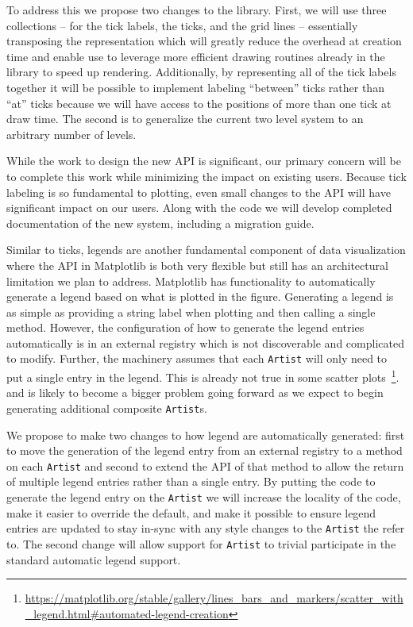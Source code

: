 \documentclass[12pt]{article}
\numberwithin{page}{section}
\begin{document}
To address this we propose two changes to the library.  First, we will use
three collections -- for the tick labels, the ticks, and the grid lines --
essentially transposing the representation which will greatly reduce the
overhead at creation time and enable use to leverage more efficient drawing
routines already in the library to speed up rendering.  Additionally, by
representing all of the tick labels together it will be possible to implement
labeling ``between'' ticks rather than ``at'' ticks because we will have access
to the positions of more than one tick at draw time.
The second is to generalize
the current two level system to an arbitrary number of levels.

While the work to design the new API is significant, our primary concern will
be to complete this work while minimizing the impact on existing users.
Because tick labeling is so fundamental to plotting, even small changes to the
API will have significant impact on our users.  Along with the code we will
develop completed documentation of the new system, including a migration guide.


Similar to ticks, legends are another fundamental component of data
visualization where the API in Matplotlib is both very flexible but still has
an architectural limitation we plan to address.  Matplotlib has functionality
to automatically generate a legend based on what is plotted in the figure.
Generating a legend is as simple as providing a string label when plotting and
then calling a single method.  However, the configuration of how to generate
the legend entries automatically is in an external registry which is not
discoverable and complicated to modify.  Further, the machinery assumes that
each \texttt{Artist} will only need to put a single entry in the legend.  This
is already not true in some scatter
plots\ \footnote{\url{https://matplotlib.org/stable/gallery/lines_bars_and_markers/scatter_with_legend.html\#automated-legend-creation}}. and
is likely to become a bigger problem going forward as we expect to begin
generating additional composite \texttt{Artist}s.


We propose to make two changes to how legend are automatically generated: first
to move the generation of the legend entry from an external registry to a
method on each \texttt{Artist} and second to extend the API of that method to
allow the return of multiple legend entries rather than a single entry.  By
putting the code to generate the legend entry on the \texttt{Artist} we will
increase the locality of the code, make it easier to override the default, and
make it possible to ensure legend entries are updated to stay in-sync with any
style changes to the \texttt{Artist} the refer to.  The second change will
allow support for \texttt{Artist} to trivial participate in the standard automatic
legend support.
\end{document}
